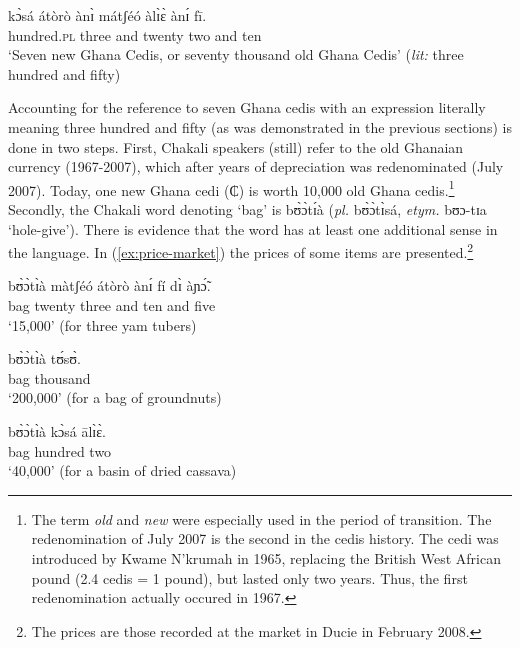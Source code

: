 \begin{exe}
\begin{exe}
\begin{exe}
{\begin{exe}
\begin{exe}
\begin{exe}
\begin{exe}
\begin{exe}
\begin{exe}
\begin{exe}
\begin{exe}
\begin{exe}
\begin{exe}
\ex\label{ex:70000}
\gll kɔ̀sá átòrò ànɪ̀ mátʃéó àlɪ̀ɛ̀ ànɪ́ fī.\\
 hundred.\textsc{pl} three and twenty two and ten\\
\glt `Seven new Ghana Cedis, or seventy thousand old Ghana Cedis' ({\it lit:}
three
hundred and fifty)\\
\end{exe} 


Accounting for the reference to seven Ghana cedis with an expression literally
meaning three hundred and fifty (as was demonstrated in the previous
sections) is done in two steps.  First, Chakali speakers (still) refer
to the old Ghanaian currency (1967-2007), which after years of depreciation was
redenominated (July 2007). Today,  one new Ghana cedi ({\W ₵}) is worth 10,000
old Ghana cedis.\footnote{The term \textit{old} and \textit{new} were especially
used in the period of transition. The redenomination of July 2007 is the second
in the cedis history. The cedi was introduced by Kwame N'krumah in 1965,
replacing the British West African pound (2.4 cedis = 1 pound), but lasted only
two years. Thus,  the first redenomination actually occured in 1967.}  Secondly,
the Chakali word denoting `bag'  is  {\sls bʊ̀ɔ̀tɪ́à} 
(\textit{pl.} {\sls  bʊ̀ɔ̀tɪ̀sá},  \textit{etym.}  {\sls bʊɔ-tɪa} 
`hole-give').  
There is evidence
that the word has at least one additional sense in the language. In
(\ref{ex:price-market}) the prices of some items are presented.\footnote{The
prices are those recorded at the market in Ducie in
February 2008.}


\ea\label{ex:price-market}

\ea\label{ex:yamtubers}
\gll bʊ̀ɔ̀tɪ̀à màtʃéó  átòrò ànɪ́ fí dɪ̀  àɲɔ̃́.\\
bag twenty three and ten and five\\
\glt `15,000' (for  three yam tubers)




\ex\label{ex:groundnutbag}
\gll bʊ̀ɔ̀tɪ̀à tʊ́sʊ̀.\\
bag thousand\\
\glt `200,000' (for a bag of groundnuts)


\ex\label{ex:driedcassava}
\gll bʊ̀ɔ̀tɪ̀à kɔ̀sá ālɪ̀ɛ̀.\\
bag hundred two\\
\glt `40,000' (for a basin of dried cassava)



\end{exe}
\end{exe}
\end{exe}
\end{exe}
\end{exe}
\end{exe}
\end{exe}
\end{exe}
\end{exe}}
\end{exe}
\end{exe}
\end{exe}
